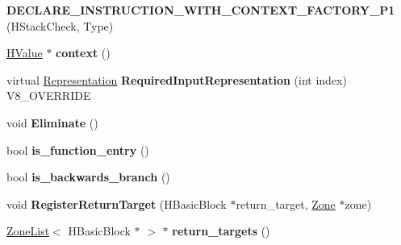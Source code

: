 \begin{DoxyCompactItemize}
\item 
\hypertarget{classv8_1_1internal_1_1_v8___f_i_n_a_l_a2925ce320925b46cfad30e97baaef31f}{}{\bfseries D\+E\+C\+L\+A\+R\+E\+\_\+\+I\+N\+S\+T\+R\+U\+C\+T\+I\+O\+N\+\_\+\+W\+I\+T\+H\+\_\+\+C\+O\+N\+T\+E\+X\+T\+\_\+\+F\+A\+C\+T\+O\+R\+Y\+\_\+\+P1} (H\+Stack\+Check, Type)\label{classv8_1_1internal_1_1_v8___f_i_n_a_l_a2925ce320925b46cfad30e97baaef31f}

\item 
\hypertarget{classv8_1_1internal_1_1_v8___f_i_n_a_l_a911a04b75b22f133c5eb5eafcc2d5f87}{}\hyperlink{classv8_1_1internal_1_1_h_value}{H\+Value} $\ast$ {\bfseries context} ()\label{classv8_1_1internal_1_1_v8___f_i_n_a_l_a911a04b75b22f133c5eb5eafcc2d5f87}

\item 
\hypertarget{classv8_1_1internal_1_1_v8___f_i_n_a_l_a6c6d1f37f40b113d8f4062f1ffff7215}{}virtual \hyperlink{classv8_1_1internal_1_1_representation}{Representation} {\bfseries Required\+Input\+Representation} (int index) V8\+\_\+\+O\+V\+E\+R\+R\+I\+D\+E\label{classv8_1_1internal_1_1_v8___f_i_n_a_l_a6c6d1f37f40b113d8f4062f1ffff7215}

\item 
\hypertarget{classv8_1_1internal_1_1_v8___f_i_n_a_l_a646836e65e635fe1ac12d41206c66e59}{}void {\bfseries Eliminate} ()\label{classv8_1_1internal_1_1_v8___f_i_n_a_l_a646836e65e635fe1ac12d41206c66e59}

\item 
\hypertarget{classv8_1_1internal_1_1_v8___f_i_n_a_l_a88de2dfaa31a314cd250ddf9aec058f7}{}bool {\bfseries is\+\_\+function\+\_\+entry} ()\label{classv8_1_1internal_1_1_v8___f_i_n_a_l_a88de2dfaa31a314cd250ddf9aec058f7}

\item 
\hypertarget{classv8_1_1internal_1_1_v8___f_i_n_a_l_a2f4d7f0afe0b514350cf4cc77266dd40}{}bool {\bfseries is\+\_\+backwards\+\_\+branch} ()\label{classv8_1_1internal_1_1_v8___f_i_n_a_l_a2f4d7f0afe0b514350cf4cc77266dd40}

\item 
\hypertarget{classv8_1_1internal_1_1_v8___f_i_n_a_l_ab65f0976195957a1df31edfa950a21b6}{}void {\bfseries Register\+Return\+Target} (H\+Basic\+Block $\ast$return\+\_\+target, \hyperlink{classv8_1_1internal_1_1_zone}{Zone} $\ast$zone)\label{classv8_1_1internal_1_1_v8___f_i_n_a_l_ab65f0976195957a1df31edfa950a21b6}

\item 
\hypertarget{classv8_1_1internal_1_1_v8___f_i_n_a_l_a7c8f624964954be150b6b4bfbf6c8f29}{}\hyperlink{classv8_1_1internal_1_1_zone_list}{Zone\+List}$<$ H\+Basic\+Block $\ast$ $>$ $\ast$ {\bfseries return\+\_\+targets} ()\label{classv8_1_1internal_1_1_v8___f_i_n_a_l_a7c8f624964954be150b6b4bfbf6c8f29}


\end{DoxyCompactItemize}
